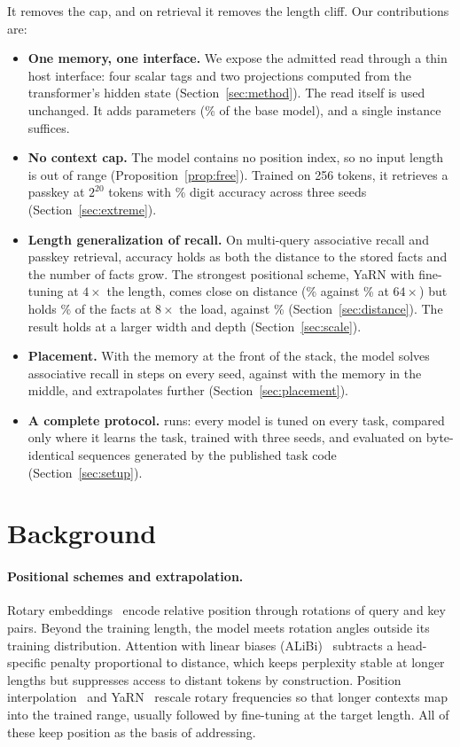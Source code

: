 \documentclass[11pt]{article}
\begin{document}
It removes the cap, and on retrieval it removes the length cliff. Our contributions are:
\begin{itemize}
\item \textbf{One memory, one interface.} We expose the admitted read through a
thin host interface: four scalar tags and two projections computed from the
transformer's hidden state (Section~\ref{sec:method}). The read itself is used
unchanged. It adds \memParams{} parameters (\memParamFrac\% of the base model), and a
single instance suffices.
\item \textbf{No context cap.} The model contains no position index, so no input
length is out of range (Proposition~\ref{prop:free}). Trained on 256 tokens, it
retrieves a passkey at $2^{20}$ tokens with \extMemOneMSeeds\% digit accuracy across
three seeds (Section~\ref{sec:extreme}).
\item \textbf{Length generalization of recall.} On multi-query associative recall and
passkey retrieval, accuracy holds as both the distance to the stored facts and the
number of facts grow. The strongest positional scheme, YaRN with fine-tuning at
$4\times$ the length, comes close on distance (\YarnFtMqarDistSixtyFour\% against
\memMqarDistSixtyFour\% at $64\times$) but holds \YarnFtMqarLoadEight\% of the facts at
$8\times$ the load, against \memMqarLoadEight\% (Section~\ref{sec:distance}). The result
holds at a larger width and depth (Section~\ref{sec:scale}).
\item \textbf{Placement.} With the memory at the front of the stack, the model solves
associative recall in \frontSolveSteps{} steps on every seed, against
\middleSolveSteps{} with the memory in the middle, and extrapolates further
(Section~\ref{sec:placement}).
\item \textbf{A complete protocol.} \runsTotal{} runs: every model is tuned on every
task, compared only where it learns the task, trained with three seeds, and
evaluated on byte-identical sequences generated by the published task code
(Section~\ref{sec:setup}).
\end{itemize}

\section{Background}
\label{sec:background}

\paragraph{Positional schemes and extrapolation.}
Rotary embeddings~\citep{su2021roformer} encode relative position through
rotations of query and key pairs. Beyond the training length, the model meets
rotation angles outside its training distribution. Attention with linear biases
(ALiBi)~\citep{press2022train} subtracts a head-specific penalty proportional to
distance, which keeps perplexity stable at longer lengths but suppresses access to
distant tokens by construction. Position interpolation~\citep{chen2023extending}
and YaRN~\citep{peng2024yarn} rescale rotary frequencies so that longer contexts
map into the trained range, usually followed by fine-tuning at the target length.
All of these keep position as the basis of addressing.
\end{document}
